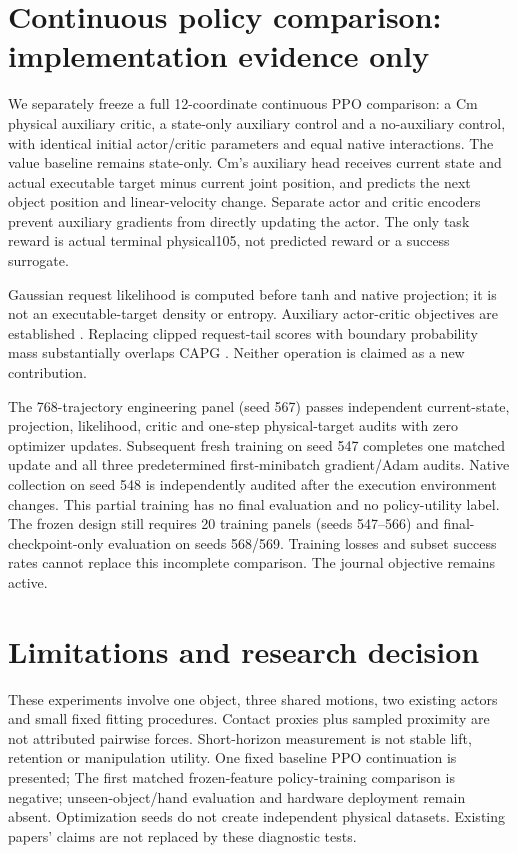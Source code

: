 \documentclass[10pt]{article}
\begin{document}
\section{Continuous policy comparison: implementation evidence only}
We separately freeze a full 12-coordinate continuous PPO comparison: a Cm
physical auxiliary critic, a state-only auxiliary control and a no-auxiliary
control, with identical initial actor/critic parameters and equal native
interactions. The value baseline remains state-only. Cm's auxiliary head
receives current state and actual executable target minus current joint
position, and predicts the next object position and linear-velocity change.
Separate actor and critic encoders prevent auxiliary gradients from directly
updating the actor. The only task reward is actual terminal physical105,
not predicted reward or a success surrogate.

Gaussian request likelihood is computed before tanh and native projection;
it is not an executable-target density or entropy. Auxiliary actor-critic
objectives are established \cite{jaderberg2016}. Replacing clipped request-tail
scores with boundary probability mass substantially overlaps CAPG
\cite{fujita2018}. Neither operation is claimed as a new contribution.

The 768-trajectory engineering panel (seed 567) passes independent current-state,
projection, likelihood, critic and one-step physical-target audits with zero
optimizer updates. Subsequent fresh training on seed 547 completes one matched
update and all three predetermined first-minibatch gradient/Adam audits.
Native collection on seed 548 is independently audited after the execution
environment changes. This partial training has no final evaluation and no
policy-utility label. The frozen design still requires 20 training panels
(seeds 547--566) and final-checkpoint-only evaluation on seeds 568/569.
Training losses and subset success rates cannot replace this incomplete
comparison. The journal objective remains active.

\section{Limitations and research decision}
These experiments involve one object, three shared motions, two existing actors
and small fixed fitting procedures. Contact proxies plus sampled proximity are
not attributed pairwise forces. Short-horizon measurement is not stable lift,
retention or manipulation utility. One fixed baseline PPO continuation is presented; The first matched frozen-feature policy-training comparison is negative;
unseen-object/hand evaluation and hardware deployment remain absent. Optimization seeds do not create independent
physical datasets. Existing papers' claims are not replaced by these diagnostic tests.
\end{document}
